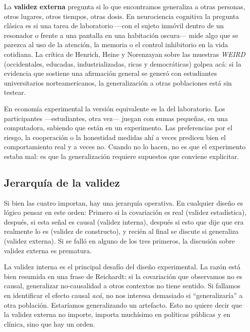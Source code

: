 \documentclass[
  letterpaper,
  DIV=11,
  numbers=noendperiod,
  oneside]{scrreprt}
\begin{document}
La \textbf{validez externa} pregunta si lo que encontramos generaliza a
otras personas, otros lugares, otros tiempos, otras dosis. En
neurociencia cognitiva la pregunta clásica es si una tarea de
laboratorio ---con el sujeto inmóvil dentro de un resonador o frente a
una pantalla en una habitación oscura--- mide algo que se parezca al uso
de la atención, la memoria o el control inhibitorio en la vida
cotidiana. La crítica de Henrich, Heine y Norenzayan sobre las muestras
\emph{WEIRD} (occidentales, educadas, industrializadas, ricas y
democráticas) golpea acá: si la evidencia que sostiene una afirmación
general se generó con estudiantes universitarios norteamericanos, la
generalización a otras poblaciones está sin testear.

En economía experimental la versión equivalente es la del laboratorio.
Los participantes ---estudiantes, otra vez--- juegan con sumas pequeñas,
en una computadora, sabiendo que están en un experimento. Las
preferencias por el riesgo, la cooperación o la honestidad medidas ahí a
veces predicen bien el comportamiento real y a veces no. Cuando no lo
hacen, no es que el experimento estaba mal: es que la generalización
requiere supuestos que conviene explicitar.

\hypertarget{jerarquuxeda-de-la-validez}{%
\subsection{Jerarquía de la validez}\label{jerarquuxeda-de-la-validez}}

Si bien las cuatro importan, hay una jerarquía operativa. En cualquier
diseño es lógico pensar en este orden: Primero si la covariación es real
(validez estadística), después, si esta señal es causal (validez
interna), después si esto que dije que era realmente lo es (validez de
constructo), y recién al final se discute si generaliza (validez
externa). Si se falló en alguno de los tres primeros, la discusión sobre
validez externa es prematura.

La validez interna es el principal desafío del diseño experimental. La
razón está bien resumida en una frase de Reichardt: si la covariación
que observamos no es causal, generalizar no-causalidad a otros contextos
no tiene sentido. Si fallamos en identificar el efecto causal
\emph{acá}, no nos interesa demasiado si ``generalizaría'' a otra
población. Estaríamos generalizando un artefacto. Esto no quiere decir
que la validez externa no importe, importa muchísimo en políticas
públicas y en clínica, sino que hay un orden.
\end{document}
